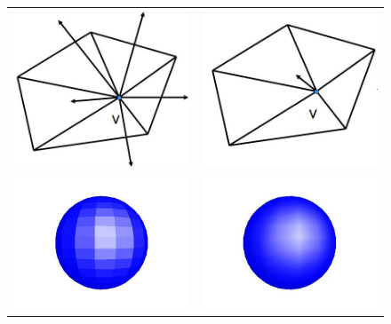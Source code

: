 \documentclass[11pt,twoside]{book}
\begin{document}
\begin{figure}[t]
\begin{center}
\begin{tabular}{cc}
\includegraphics[width=3.0in]{figures/triangle_normal}&
\includegraphics[width=3.0in]{figures/triangle_normal2}\\
\includegraphics[width=3.0in]{figures/sphere_facet}&
\includegraphics[width=3.0in]{figures/sphere_lit}\\

\end{tabular}
\end{center}
\end{figure}
\end{document}

